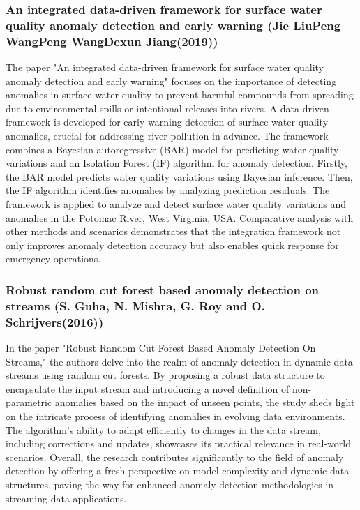 \documentclass[12pt]{report}
\begin{document}
\subsubsection{An integrated data-driven framework for surface water quality anomaly detection and early warning (Jie LiuPeng WangPeng WangDexun Jiang(2019))}
\par
The paper "An integrated data-driven framework for surface water quality anomaly detection and early warning" \cite{paper2} focuses on the importance of detecting anomalies in surface water quality to prevent harmful compounds from spreading due to environmental spills or intentional releases into rivers. A data-driven framework is developed for early warning detection of surface water quality anomalies, crucial for addressing river pollution in advance. The framework combines a Bayesian autoregressive (BAR) model for predicting water quality variations and an Isolation Forest (IF) algorithm for anomaly detection. Firstly, the BAR model predicts water quality variations using Bayesian inference. Then, the IF algorithm identifies anomalies by analyzing prediction residuals. The framework is applied to analyze and detect surface water quality variations and anomalies in the Potomac River, West Virginia, USA. Comparative analysis with other methods and scenarios demonstrates that the integration framework not only improves anomaly detection accuracy but also enables quick response for emergency operations.
\subsubsection{Robust random cut
forest based anomaly detection on streams (S. Guha, N. Mishra, G. Roy and O. Schrijvers(2016))}
\par
In the paper "Robust Random Cut Forest Based Anomaly Detection On Streams," \cite{paper3} the authors delve into the realm of anomaly detection in dynamic data streams using random cut forests. By proposing a robust data structure to encapsulate the input stream and introducing a novel definition of non-parametric anomalies based on the impact of unseen points, the study sheds light on the intricate process of identifying anomalies in evolving data environments. The algorithm's ability to adapt efficiently to changes in the data stream, including corrections and updates, showcases its practical relevance in real-world scenarios. Overall, the research contributes significantly to the field of anomaly detection by offering a fresh perspective on model complexity and dynamic data structures, paving the way for enhanced anomaly detection methodologies in streaming data applications.
\end{document}
